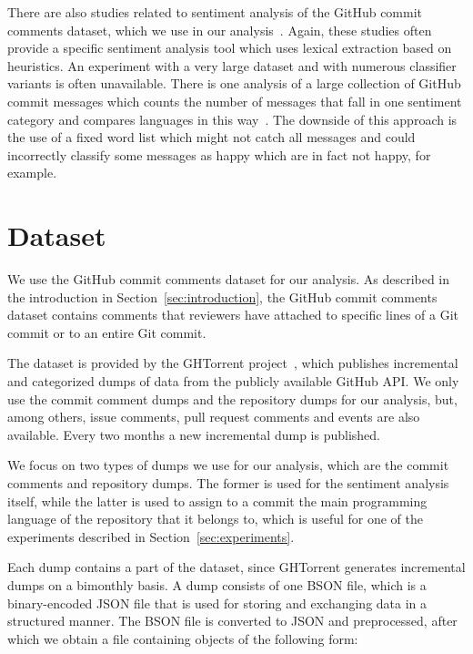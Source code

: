 \documentclass{article}
\begin{document}
There are also studies related to sentiment analysis of the GitHub commit 
comments dataset, which we use in our 
analysis~\cite{guzman2014github,pletea2014security}. Again, these studies often 
provide a specific sentiment analysis tool which uses lexical extraction based 
on heuristics. An experiment with a very large dataset and with numerous 
classifier variants is often unavailable. There is one analysis of a large 
collection of GitHub commit messages which counts the number of messages that 
fall in one sentiment category and compares languages in this 
way~\cite{geeksta}. The downside of this approach is the use of a fixed word 
list which might not catch all messages and could incorrectly classify some 
messages as happy which are in fact not happy, for example.

\section{Dataset}\label{sec:dataset}
We use the GitHub commit comments dataset for our analysis. As described in the
introduction in Section~\ref{sec:introduction}, the GitHub commit comments
dataset contains comments that reviewers have attached to specific lines of
a Git commit or to an entire Git commit.

The dataset is provided by the GHTorrent 
project~\cite{ghtorrent,gousi2013ghtorrent}, which
publishes incremental and categorized dumps of data from the publicly
available GitHub API\@. We only use the commit comment dumps and the
repository dumps for our analysis, but, among others, issue comments, pull
request comments and events are also available. Every two months a new
incremental dump is published.

We focus on two types of dumps we use for our analysis, which are the
commit comments and repository dumps. The former is used for the sentiment
analysis itself, while the latter is used to assign to a commit the main 
programming language of the repository that it belongs to, which is useful for 
one of the experiments described in Section~\ref{sec:experiments}.

Each dump contains a part of the dataset, since GHTorrent generates incremental 
dumps on a bimonthly basis. A dump consists of one BSON file, which is 
a binary-encoded JSON file that is used for storing and exchanging data in 
a structured manner. The BSON file is converted to JSON and preprocessed, after 
which we obtain a file containing objects of the following form:
\end{document}
